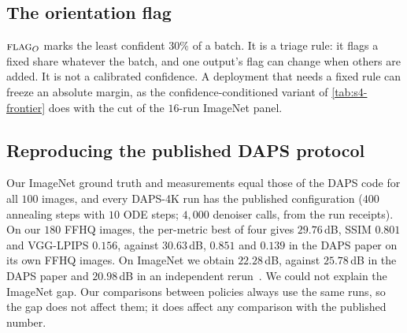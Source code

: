 \subsection{The orientation flag}
\label{sec:suppl-flago}
$\textsc{flag}_O$ marks the least confident $30\%$ of a batch.
It is a triage rule: it flags a fixed share whatever the batch, and one output's flag can change when others are added.
It is not a calibrated confidence.
A deployment that needs a fixed rule can freeze an absolute margin, as the confidence-conditioned variant of \cref{tab:s4-frontier} does with the cut of the $16$-run ImageNet panel.

\subsection{Reproducing the published DAPS protocol}
\label{sec:suppl-dapsrepro}
Our ImageNet ground truth and measurements equal those of the DAPS code for all $100$ images, and every DAPS-4K run has the published configuration ($400$ annealing steps with $10$ ODE steps; $4{,}000$ denoiser calls, from the run receipts).
On our $180$ FFHQ images, the per-metric best of four gives $29.76$\,dB, SSIM $0.801$ and VGG-LPIPS $0.156$, against $30.63$\,dB, $0.851$ and $0.139$ in the DAPS paper on its own FFHQ images.
On ImageNet we obtain $22.28$\,dB, against $25.78$\,dB in the DAPS paper and $20.98$\,dB in an independent rerun~\cite{kocabas2026pcdaps}.
We could not explain the ImageNet gap.
Our comparisons between policies always use the same runs, so the gap does not affect them; it does affect any comparison with the published number.
